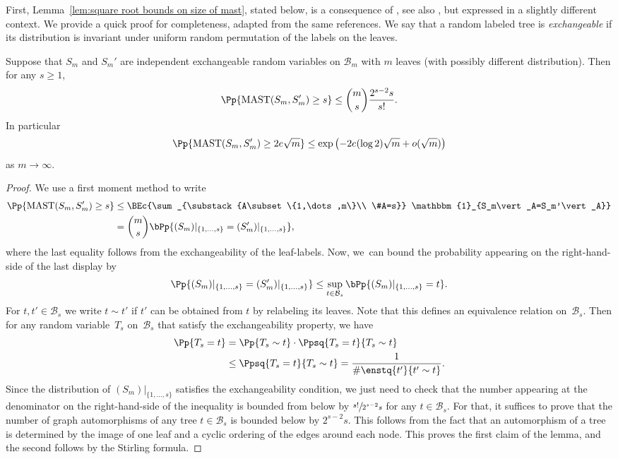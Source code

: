 First, Lemma~\ref{lem:square root bounds on size of mast}, stated below, is a consequence of \cite[Lem.\,4.1]{bryant_size_2003}, see also \cite[Lem.\,4.1, Prop.\,4.2]{bernstein_bounds_2015}, but expressed in a slightly different context.
We provide a quick proof for completeness, adapted from the same references. We say that a random labeled tree is \emph{exchangeable} if its distribution is invariant under uniform random permutation of the labels on the leaves.
\begin{lemma}\label{lem:square root bounds on size of mast}
Suppose that $S_m$ and $S_m'$ are independent exchangeable random variables on $\mathcal{B}_m$ with $m$ leaves (with possibly different distribution). Then for any $s\geq 1$,
\begin{align*}
\Pp{\mathrm{MAST}(S_m,S_m') \geq s} \leq \binom{m}{s} \frac{2^{s-2}s}{s!}.
\end{align*}
In particular
\begin{align*}
\Pp{\mathrm{MAST}(S_m,S_m') \geq 2 e \sqrt{m}} \leq \exp \left(-2e (\log 2) \sqrt{m} + o(\sqrt{m}) \right)
\end{align*}
as $m \rightarrow \infty$.
\end{lemma}
\begin{proof}
We use a first moment method to write
\begin{align*}
\Pp{\mathrm{MAST}(S_m,S_m')\geq s} &\leq \BEc{\sum_{\substack{A\subset \{1,\dots,m\}\\ \#A=s}} \mathbbm{1}_{S_m\vert_A=S_m'\vert_A}} \\
&=\binom{m}{s} \bPp{(S_m)\vert_{\{1,\dots,s\}}=(S_m')\vert_{\{1,\dots,s\}}},
\end{align*}
where the last equality follows from the exchangeability of the leaf-labels.
Now, we~can bound the probability appearing on the right-hand-side of the last display by
\begin{align*}
\Pp{(S_m)\vert_{\{1,\dots,s\}}=(S_m')\vert_{\{1,\dots,s\}}}
\leq \sup_{t\in \mathcal{B}_s} \bPp{(S_m)\vert_{\{1,\dots,s\}}=t}.
\end{align*}
For $t,t'\in \mathcal{B}_s$ we write $t\sim t'$ if $t'$ can be obtained from $t$ by relabeling its leaves.
Note that this defines an equivalence relation on~$\mathcal{B}_s$.
Then for any random variable~$T_s$ on~$\mathcal{B}_s$ that satisfy the exchangeability property, we have
\begin{align*}
\Pp{T_s=t} &= \Pp{T_s\sim t} \cdot \Ppsq{T_s=t}{T_s\sim t}\\
& \leq \Ppsq{T_s=t}{T_s\sim t}=\frac{1}{\#\enstq{t'}{t'\sim t}}.
\end{align*}
Since the distribution of $(S_m)\vert_{\{1,\dots,s\}}$ satisfies the exchangeability condition, we just need to check that the number appearing at the denominator on the right-hand-side of the inequality is bounded from below by $\sfrac{s!}{2^{s-2}s}$ for any $t\in \mathcal{B}_s$.
For that, it suffices to prove that the number of graph automorphisms of any tree $t\in \mathcal{B}_s$ is bounded below by $2^{s-2}s$. This follows from the fact that an automorphism of a tree is determined by the image of one leaf and a cyclic ordering of the edges around each node. This proves the first claim of the lemma, and the second follows by the Stirling formula.
\end{proof}
